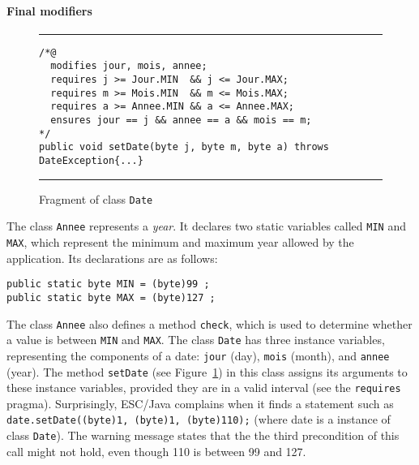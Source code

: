 \documentclass[a4paper]{llncs}
\begin{document}






\paragraph{Final modifiers}

\begin{figure}[t]
\rule{\linewidth}{0.3mm}
\begin{verbatim}
/*@
  modifies jour, mois, annee;
  requires j >= Jour.MIN  && j <= Jour.MAX;
  requires m >= Mois.MIN  && m <= Mois.MAX;
  requires a >= Annee.MIN && a <= Annee.MAX;
  ensures jour == j && annee == a && mois == m;
*/
public void setDate(byte j, byte m, byte a) throws DateException{...} 
\end{verbatim}
\caption{Fragment of class {\tt Date}}
\label{fig-cla-dat}
\rule{\linewidth}{0.3mm}
\end{figure}



The class \texttt{Annee} represents a \textit{year}. It 
declares two
static variables called \texttt{MIN} and \texttt{MAX}, which represent
the minimum and maximum year allowed by the application.
Its declarations are as follows:
\begin{verbatim}
public static byte MIN = (byte)99 ;
public static byte MAX = (byte)127 ;
\end{verbatim}

The class \texttt{Annee} also defines a method \texttt{check}, which is
used to determine whether a value is between \texttt{MIN} and \texttt{MAX}. The
class \texttt{Date} has three instance variables, representing the
components of a date: \texttt{jour} (day),
\texttt{mois} (month), and \texttt{annee} (year). The method
\texttt{setDate} (see Figure~\ref{fig-cla-dat})
in this class assigns its arguments to these
instance variables, provided they are in a valid interval (see the
\texttt{requires} pragma). %
Surprisingly, ESC/Java complains when it
finds a statement such as
\mbox{\tt date.setDate((byte)1, (byte)1, (byte)110);} (where date is a
instance of class \texttt{Date}). The warning message states that the
the third precondition of this call might not hold, even though 110 is 
between 99 and 127.
\end{document}
